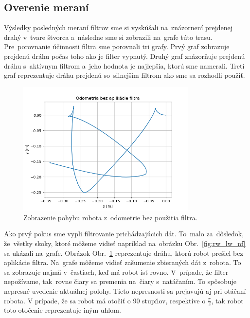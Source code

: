 \clearpage

\subsection{Overenie meraní}
\label{subsec:overenie_merani}

Výsledky posledných meraní filtrov sme si vyskúšali na~znázornení prejdenej drahý v~tvare štvorca a~následne sme si
zobrazili na~grafe túto trasu. Pre~porovnanie účinnosti filtra sme porovnali tri grafy. Prvý graf zobrazuje prejdenú
dráhu počas toho ako je filter vypnutý. Druhý graf znázorňuje prejdenú dráhu s~aktívnym filtrom a~jeho hodnota je
najlepšia, ktorú sme namerali. Tretí graf reprezentuje dráhu prejdenú so~silnejším filtrom ako sme sa rozhodli použiť.

\begin{figure}[!htbp]
	\begin{center}
		\includegraphics[width=0.8\textwidth]{img/stvorec_bez_filtra.png}
	\end{center}
	\caption{Zobrazenie pohybu robota z~odometrie bez použitia filtra.}
	\label{fig:stvorecBezFiltra}
\end{figure}

Ako prvý pokus sme vypli filtrovanie prichádzajúcich dát. To~malo za~dôsledok, že~všetky skoky, ktoré môžeme vidieť
napríklad na~obrázku Obr.~\ref{fig:rw_lw_nf} sa ukázali na~grafe. Obrázok Obr.~\ref{fig:stvorecBezFiltra} reprezentuje
dráhu, ktorú robot prešiel bez aplikácie filtra. Na~grafe môžeme vidieť zašumenie zbieraných dát z~robota. To sa
zobrazuje najmä v~častiach, keď má robot isť rovno. V~prípade, že filter nepožívame, tak~rovne čiary sa premenia na~čiary
s~natáčaním. To spôsobuje nepresné uvedenie aktuálnej polohy. Tieto nepresnosti sa prejavujú aj pri otáčaní robota.
V prípade, že sa robot má otočiť o 90 stupňov, respektíve o $\frac{\pi}{2}$, tak robot toto otočenie reprezentuje iným
uhlom.

